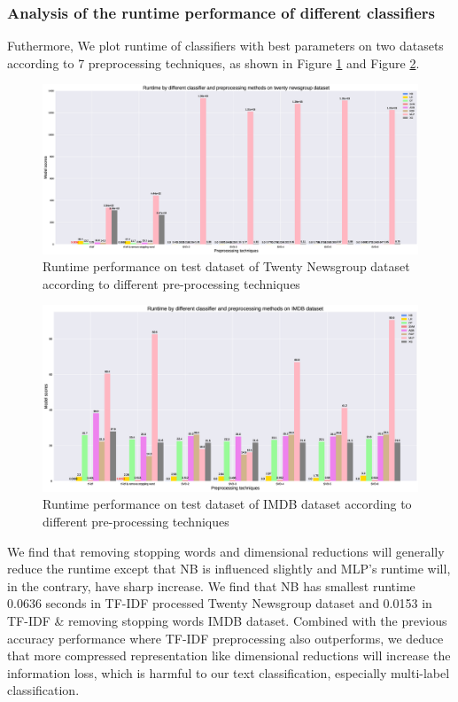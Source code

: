 \documentclass[11pt]{scrartcl}
\begin{document}
\subsubsection*{Analysis of the runtime performance of different classifiers}
Futhermore, We plot runtime of classifiers with best parameters on two datasets according to 7 preprocessing techniques, as shown in Figure \ref{runtime_20} and Figure \ref{runtime_imdb}.

\begin{figure}[H]
	\centering
	\includegraphics[width=0.9\linewidth]{fig/model_runtime_20.eps}
	\caption{Runtime performance on test dataset of Twenty Newsgroup dataset according to different pre-processing techniques}
	\label{runtime_20}
\end{figure}

\begin{figure}[H]
	\centering
	\includegraphics[width=0.9\linewidth]{fig/model_runtime_imdb.eps}
	\caption{Runtime performance on test dataset of IMDB dataset according to different pre-processing techniques}
	\label{runtime_imdb}
\end{figure}

We find that removing stopping words and dimensional reductions will generally reduce the runtime except that NB is influenced slightly and MLP's runtime will, in the contrary, have sharp increase. We find that NB has smallest runtime 0.0636 seconds in TF-IDF processed Twenty Newsgroup dataset and 0.0153 in TF-IDF \& removing stopping words IMDB dataset. Combined with the previous accuracy performance where TF-IDF preprocessing also outperforms, we deduce that more compressed representation like dimensional reductions will increase the information loss, which is harmful to our text classification, especially multi-label classification.
\end{document}
